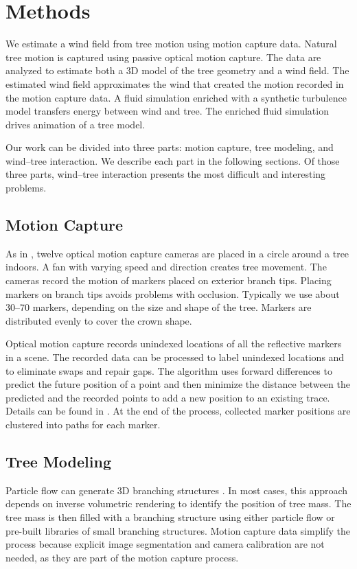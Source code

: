 \section{Methods}

We estimate a wind field from tree motion using motion capture data.  Natural tree motion is captured using passive optical motion capture.  The data are analyzed to estimate both a 3D model of the tree geometry and a wind field.  The estimated wind field approximates the wind that created the motion recorded in the motion capture data.  A fluid simulation enriched with a synthetic turbulence model transfers energy between wind and tree.  The enriched fluid simulation drives animation of a tree model.  

Our work can be divided into three parts: motion capture, tree modeling, and wind--tree interaction. We describe each part in the following sections. Of those three parts, wind--tree interaction presents the most difficult and interesting problems. 

\subsection{Motion Capture}

As in \cite{Long:MCN2010}, twelve optical motion capture cameras are placed in a circle around a tree indoors. A fan with varying speed and direction creates tree movement. The cameras record the motion of markers placed on exterior branch tips. Placing markers on branch tips avoids problems with occlusion. Typically we use about 30--70 markers, depending on the size and shape of the tree. Markers are distributed evenly to cover the crown shape. 

Optical motion capture records unindexed locations of all the reflective markers in a scene. The recorded data can be processed to label unindexed locations and to eliminate swaps and repair gaps. The algorithm uses forward differences to predict the future position of a point and then minimize the distance between the predicted and the recorded points to add a new position to an existing trace. Details can be found in \cite{Long:MCN2010}. At the end of the process, collected marker positions are clustered into paths for each marker. 

\subsection{Tree Modeling}

Particle flow can generate 3D branching structures \cite{Tan:2007:ITM,neubert:acmtg07,Runions07}. In most cases, this approach depends on inverse volumetric rendering to identify the position of tree mass.  The tree mass is then filled with a branching structure using either particle flow or pre-built libraries of small branching structures.  Motion capture data simplify the process because explicit image segmentation and camera calibration are not needed, as they are part of the motion capture process.  

